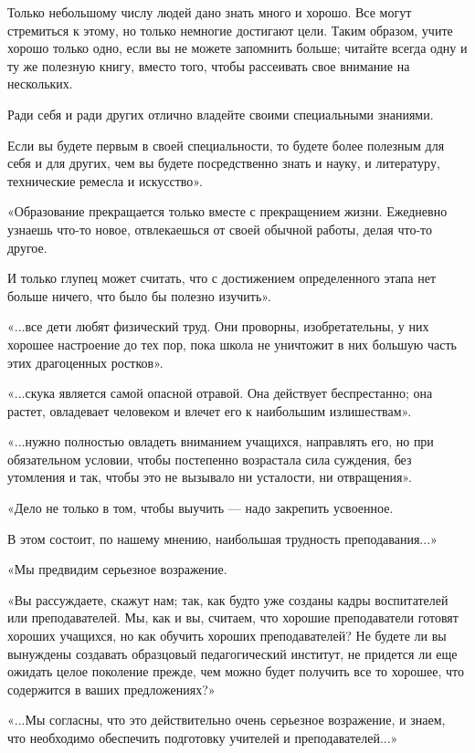 \documentclass[12pt, a4paper, openany]{book}
\begin{document}
Только небольшому числу людей дано знать много и хорошо. Все могут стремиться к этому, но только немногие достигают цели. Таким образом, учите хорошо только одно, если вы не можете запомнить больше; читайте всегда одну и ту же полезную книгу, вместо того, чтобы  рассеивать свое внимание на нескольких. 

Ради себя и ради других отлично владейте своими  специальными знаниями. 

Если вы будете первым в своей специальности, то будете более полезным для себя и для других, чем вы будете  посредственно знать и науку, и литературу, технические ремесла и искусство». 

«Образование прекращается только вместе с  прекращением жизни. Ежедневно узнаешь что-то новое,  отвлекаешься от своей обычной работы, делая что-то другое. 

И только глупец может считать, что с достижением определенного этапа нет больше ничего, что было бы  полезно изучить». 

«...все дети любят физический труд. Они проворны, изобретательны, у них хорошее настроение до тех пор, пока школа не уничтожит в них большую часть этих  драгоценных ростков». 

«...скука является самой опасной отравой. Она  действует беспрестанно; она растет, овладевает человеком и влечет его к наибольшим излишествам». 

«...нужно полностью овладеть вниманием учащихся, направлять его, но при обязательном условии, чтобы  постепенно возрастала сила суждения, без утомления и так, чтобы это не вызывало ни усталости, ни отвращения». 

«Дело не только в том, чтобы выучить — надо закрепить усвоенное. 

В этом состоит, по нашему мнению, наибольшая  трудность преподавания...» 

«Мы предвидим серьезное возражение. 

«Вы рассуждаете, скажут нам; так, как будто уже  созданы кадры воспитателей или преподавателей. Мы, как и вы, считаем, что хорошие преподаватели готовят  хороших учащихся, но как обучить хороших  преподавателей? Не будете ли вы вынуждены создавать образцовый педагогический институт, не придется ли еще ожидать целое поколение прежде, чем можно будет получить все то хорошее, что содержится в ваших предложениях?» 

«...Мы согласны, что это действительно очень серьезное возражение, и знаем, что необходимо обеспечить  подготовку учителей и преподавателей...» 
\end{document}
